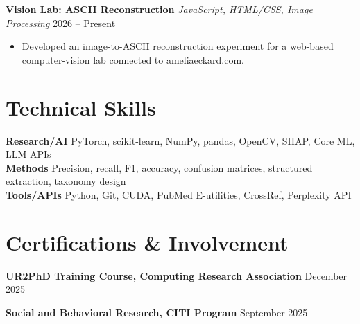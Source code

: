 \documentclass[letterpaper,10pt]{article}
\newcommand{\projectentry}[3]{
  \noindent\textbf{#1} \textbar{} \textit{#2} \hfill #3
}
\newcommand{\activityentry}[2]{
  \noindent\textbf{#1} \hfill #2
}
\begin{document}
\smallskip

\projectentry
  {Vision Lab: ASCII Reconstruction}
  {JavaScript, HTML/CSS, Image Processing}
  {2026 -- Present}
\begin{itemize}
  \item Developed an image-to-ASCII reconstruction experiment for a web-based computer-vision lab connected to ameliaeckard.com.
\end{itemize}

\section{Technical Skills}

\noindent\textbf{Research/AI} \quad PyTorch, scikit-learn, NumPy, pandas, OpenCV, SHAP, Core ML, LLM APIs \\[1pt]
\noindent\textbf{Methods} \quad Precision, recall, F1, accuracy, confusion matrices, structured extraction, taxonomy design \\[1pt]
\noindent\textbf{Tools/APIs} \quad Python, Git, CUDA, PubMed E-utilities, CrossRef, Perplexity API

\section{Certifications \& Involvement}

\activityentry
  {UR2PhD Training Course, Computing Research Association}{December 2025}

\smallskip

\activityentry
  {Social and Behavioral Research, CITI Program}{September 2025}
\end{document}
